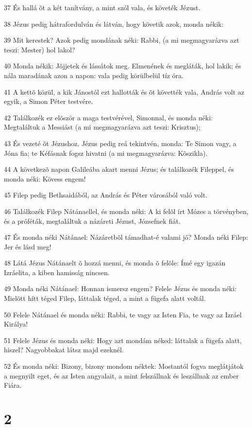 \par 37 És hallá õt a két tanítvány, a mint szól vala, és követék Jézust.
\par 38 Jézus pedig hátrafordulván és látván, hogy követik azok, monda nékik:
\par 39 Mit kerestek? Azok pedig mondának néki: Rabbi, (a mi megmagyarázva azt teszi: Mester) hol lakol?
\par 40 Monda nékik: Jõjjetek és lássátok meg. Elmenének és megláták, hol lakik; és nála maradának azon a napon: vala pedig körülbelül tíz óra.
\par 41 A kettõ közül, a kik Jánostól ezt hallották és õt követték vala, András volt az egyik, a Simon Péter testvére.
\par 42 Találkozék ez elõször a maga testvérével, Simonnal, és monda néki: Megtaláltuk a Messiást (a mi megmagyarázva azt teszi: Krisztus);
\par 43 És vezeté õt Jézushoz. Jézus pedig reá tekintvén, monda: Te Simon vagy, a Jóna fia; te Kéfásnak fogsz hivatni (a mi megmagyarázva: Kõszikla).
\par 44 A következõ napon Galileába akart menni Jézus; és találkozék Fileppel, és monda néki: Kövess engem!
\par 45 Filep pedig Bethsaidából, az András és Péter városából való volt.
\par 46 Találkozék Filep Nátánaellel, és monda néki: A ki felõl írt Mózes a törvényben, és a próféták, megtaláltuk a názáreti Jézust, Józsefnek fiát.
\par 47 És monda néki Nátánael: Názáretbõl támadhat-é valami jó? Monda néki Filep: Jer és lásd meg!
\par 48 Látá Jézus Nátánaelt õ hozzá menni, és monda õ felõle: Ímé egy igazán Izráelita, a kiben hamisság nincsen.
\par 49 Monda néki Nátánael: Honnan ismersz engem? Felele Jézus és monda néki: Mielõtt hítt téged Filep, láttalak téged, a mint a fügefa alatt voltál.
\par 50 Felele Nátánael és monda néki: Rabbi, te vagy az Isten Fia, te vagy az Izráel Királya!
\par 51 Felele Jézus és monda néki: Hogy azt mondám néked: láttalak a fügefa alatt, hiszel? Nagyobbakat látsz majd ezeknél.
\par 52 És monda néki: Bizony, bizony mondom néktek: Mostantól fogva meglátjátok a megnyilt eget, és az Isten angyalait, a mint felszállnak és leszállnak az ember Fiára.

\chapter{2}

